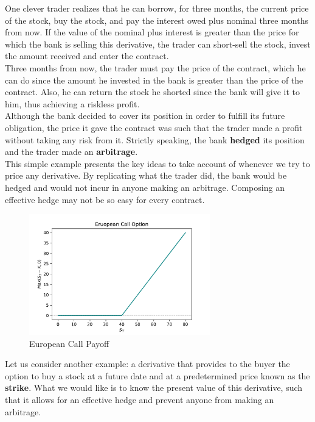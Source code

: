 \documentclass[../TGMAFFIRO]{subfiles}
\begin{document}
 One clever trader realizes that he can borrow, for three months, the current price of the stock, buy the stock, and pay the interest owed plus nominal three months from now. If the value of the nominal plus interest is greater than the price for which the bank is selling this derivative, the trader can short-sell the stock, invest the amount received and enter the contract.\\
 
  Three months from now, the trader must pay the price of the contract, which he can do since the amount he invested in the bank is greater than the price of the contract. Also, he can return the stock he shorted since the bank will give it to him, thus achieving a riskless profit.\\

Although the bank decided to cover its position in order to fulfill its future obligation, the price it gave the contract was such that the trader made a profit without taking any risk from it. Strictly speaking, the bank \textbf{hedged} its position and the trader made an \textbf{arbitrage}.\\

This simple example presents the key ideas to take account of whenever we try to price any derivative. By replicating what the trader did, the bank would be hedged and would not incur in anyone making an arbitrage. Composing an effective hedge may not be so easy for every contract.\\

\begin{figure}[h]
	\centering
	\label{fig:call_option_payoff}
	\includegraphics[width=0.7\textwidth]{../images/Call.pdf}	
	\caption{European Call Payoff}
\end{figure}


Let us consider another example: a derivative that provides to the buyer the option to buy a stock at a future date and at a predetermined price known as the \textbf{strike}. What we would like is to know the present value of this derivative, such that it allows for an effective hedge and prevent anyone from making an arbitrage.\\
\end{document}
